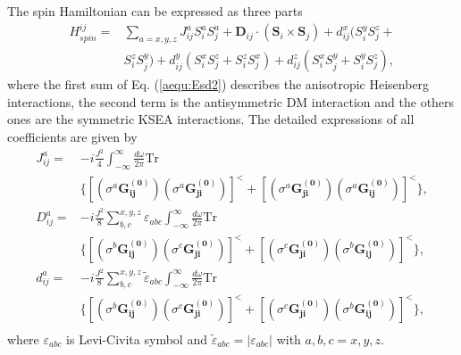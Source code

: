 \documentclass[aps,prb,twocolumn,showpacs,amssymb]{revtex4-1}
\begin{document}
\begin{appendix}
The spin Hamiltonian can be expressed as three parts
\begin{equation}\label{aequ:Esd2}
\begin{aligned}
H_{spin}^{ij}=&\sum\limits_{a=x,y,z}J^{a}_{ij}S^a_iS^a_j+\bm{D}_{ij}\cdot(\bm{S}_{i}\times\bm{S}_{j})+d^x_{ij}(S^y_iS^z_j+\\
&S^z_iS^y_j)+d^y_{ij}(S^x_iS^z_j+S^z_iS^x_j)+d^z_{ij}(S^x_iS^y_j+S^y_iS^z_j),
\end{aligned}
\end{equation}
where the first sum of Eq. (\ref{aequ:Esd2}) describes the anisotropic Heisenberg interactions, the second term is the antisymmetric DM interaction and the others ones are the symmetric KSEA interactions. The detailed expressions of all coefficients are given by
\begin{equation}\label{aequ:JD}
\begin{aligned}
J^{a}_{ij}=&-i\frac{J^2}{4}\int^{\infty}_{-\infty}\frac{d\omega}{2\pi}\mathrm{Tr}\\
&\{[(\sigma^{a}\bm{G^{(0)}_{ij}})(\sigma^{a}\bm{G^{(0)}_{ji}})]^{<}
+[(\sigma^{a}\bm{G^{(0)}_{ji}})(\sigma^{a}\bm{G^{(0)}_{ij}})]^{<}\},\\
D^{a}_{ij}=&-i\frac{J^2}{8}\sum\limits_{b,c}^{x,y,z}\varepsilon_{abc}\int^{\infty}_{-\infty}\frac{d\omega}{2\pi}\mathrm{Tr}\\
&\{[(\sigma^{b}\bm{G^{(0)}_{ij}})(\sigma^{c}\bm{G^{(0)}_{ji}})]^{<}
+[(\sigma^{c}\bm{G^{(0)}_{ji}})(\sigma^{b}\bm{G^{(0)}_{ij}})]^{<}\},\\
d^{a}_{ij}=&-i\frac{J^2}{8}\sum\limits_{b,c}^{x,y,z}\tilde{{\varepsilon}}_{abc}\int^{\infty}_{-\infty}\frac{d\omega}{2\pi}\mathrm{Tr}\\
&\{[(\sigma^{b}\bm{G^{(0)}_{ij}})(\sigma^{c}\bm{G^{(0)}_{ji}})]^{<}
+[(\sigma^{c}\bm{G^{(0)}_{ji}})(\sigma^{b}\bm{G^{(0)}_{ij}})]^{<}\}, \\
\end{aligned}
\end{equation}
where $\varepsilon_{abc}$ is Levi-Civita symbol and $\tilde{{\varepsilon}}_{abc}=|{\varepsilon}_{abc}|$ with $a, b, c=x, y, z$.


\end{appendix}
\end{document}
